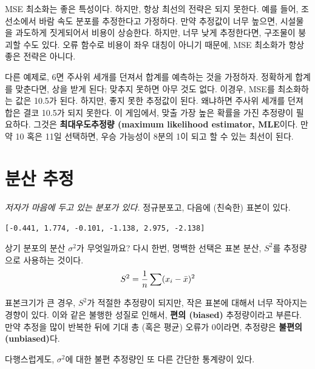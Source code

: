 MSE 최소화는 좋은 특성이다. 하지만, 항상 최선의 전략은 되지 못한다.
예를 들어, 조선소에서 바람 속도 분포를 추정한다고 가정하다.
만약 추정값이 너무 높으면, 시설물을 과도하게 짓게되어서 비용이 상승한다.
하지만, 너무 낮게 추정한다면, 구조물이 붕괴할 수도 있다. 오류 함수로 비용이 좌우 대칭이 아니기 때문에, MSE 최소화가 항상 좋은 전략은 아니다.

다른 예제로, 6면 주사위 세개를 던져서 합계를 예측하는 것을 가정하자.
정확하게 합계를 맞춘다면, 상을 받게 된다; 맞추지 못하면 아무 것도 없다.
이경우, MSE를 최소화하는 값은 10.5가 된다. 하지만, 좋지 못한 추정값이 된다.
왜냐하면 주사위 세개를 던져 합은 결코 10.5가 되지 못한다. 이 게임에서,
맞출 가장 높은 확률을 가진 추정량이 필요하다. 그것은 {\bf 최대우도추정량 (maximum likelihood estimator, MLE}이다. 만약 10 혹은 11일 선택하면,
우승 가능성이 8분의 1이 되고 할 수 있는 최선이 된다.



\section{분산 추정}

{\em 저자가 마음에 두고 있는 분포가 있다.} 정규분포고, 다음에 (친숙한) 표본이 있다.

{\tt [-0.441, 1.774, -0.101, -1.138, 2.975, -2.138]}

상기 분포의 분산 $\sigma^2$가 무엇일까요? 다시 한번, 명백한 선택은
표본 분산, $S^2$를 추정량으로 사용하는 것이다.
%
\[ S^2 = \frac{1}{n} \sum (x_i - \bar{x})^2 \] 
%

표본크기가 큰 경우, $S^2$가 적절한 추정량이 되지만, 작은 표본에 대해서 너무 작아지는 경향이 있다. 이와 같은 불행한 성질로 인해서, {\bf 편의 (biased)} 추정량이라고 부른다. 
만약 추정을 많이 반복한 뒤에 기대 총 (혹은 평균) 오류가 0이라면, 추정량은 
{\bf 불편의(unbiased)}다. 


다행스럽게도, $\sigma^2$에 대한 불편 추정량인 또 다른 간단한 통계량이 있다.

